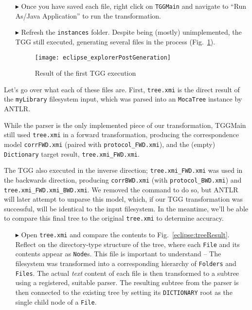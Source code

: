 \begin{itemize} 

\item[$\blacktriangleright$] Once you have saved each file, right click on \texttt{TGGMain} and navigate to ``Run As/Java Application'' to run the
transformation.

\item[$\blacktriangleright$] Refresh the \texttt{instances} folder. Despite being (mostly) unimplemented, the TGG still executed, generating several files in
the process (Fig.~\ref{eclipse:postParse}).

\vspace{0.5cm}

\begin{figure}[!htbp]
\begin{center}
 \texttt{[image: eclipse\_explorerPostGeneration]}
  \caption{Result of the first TGG execution}
  \label{eclipse:postParse}
\end{center}
\end{figure} 

\end{itemize}

Let's go over what each of these files are. First, \texttt{tree.xmi} is the direct result of the \texttt{my\-Lib\-rary} filesystem input, which was parsed into
an \texttt{MocaTree} instance by ANTLR. 

While the parser is the only implemented piece of our transformation, TGGMain still used \texttt{tree.xmi} in a forward transformation, producing
the correspondence model \texttt{corrFWD.xmi} (paired with \texttt{protocol\_FWD.xmi}), and the (empty) \texttt{Dictionary} target result,
\texttt{tree.xmi\_FWD.xmi}.

\clearpage

The TGG also executed in the inverse direction; \texttt{tree.xmi\_FWD.xmi} was used in the backwards direction, producing \texttt{corrBWD.xmi} (with
\texttt{proto\-col\-\_BWD\-.xmi}) and \texttt{tree.xmi\_FWD.xmi\_BWD.xmi}. We removed the command to do so, but ANTLR will later attempt to unparse this model,
which, if our TGG transformation was successful, will be identical to the input filesystem. In the meantime, we'll be able to compare this final tree to the original
\texttt{tree.xmi} to determine accuracy.

\begin{itemize}

\item[$\blacktriangleright$] Open \texttt{tree.xmi} and compare the contents to Fig.~\ref{eclipse:treeResult}. Reflect on the directory-type structure of the
tree, where each \texttt{File} and its contents appear as \texttt{Node}s. This file is important to understand -- The filesystem was transformed into a
corresponding hierarchy of \texttt{Folders} and \texttt{Files}. The actual \emph{text} content of each file is then transformed to a subtree using a registered,
suitable parser. The resulting subtree from the parser is then connected to the existing tree by setting its \texttt{DICTIONARY} root as the single child node
of a \texttt{File}.

\end{itemize}

